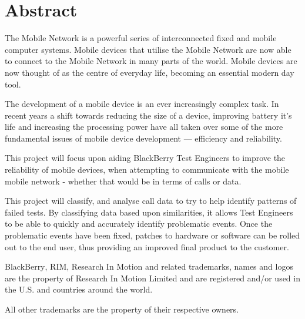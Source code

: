 \section*{Abstract}
The Mobile Network is a powerful series of interconnected fixed and mobile 
computer systems. Mobile devices that utilise the Mobile Network are now able 
to connect to the Mobile Network in many parts of the world. Mobile devices are 
now thought of as the centre of everyday life, becoming an essential modern day
tool.

The development of a mobile device is an ever increasingly complex task. In 
recent years a shift towards reducing the size of a device, improving battery 
it's life and increasing the processing power have all taken over some of the 
more fundamental issues of mobile device development --- efficiency and 
reliability.

This project will focus upon aiding BlackBerry Test Engineers to improve the 
reliability of mobile devices, when attempting to communicate with the mobile 
mobile network - whether that would be in terms of calls or data.

This project will classify, and analyse call data to try to help identify 
patterns of failed tests. By classifying data based upon similarities, it 
allows Test Engineers to be able to quickly and accurately identify problematic 
events. Once the problematic events have been fixed, patches to hardware or 
software can be rolled out to the end user, thus providing an improved final 
product to the customer.

\vfill
\thispagestyle{empty}

{
  \scriptsize

  BlackBerry\textsuperscript{\textregistered}, 
  RIM\textsuperscript{\textregistered}, 
  Research In Motion\textsuperscript{\textregistered} and related trademarks, 
  names and logos are the property of Research In Motion Limited and are 
  registered and/or used in the U.S. and countries around the world. 

  All other trademarks are the property of their respective owners.
}